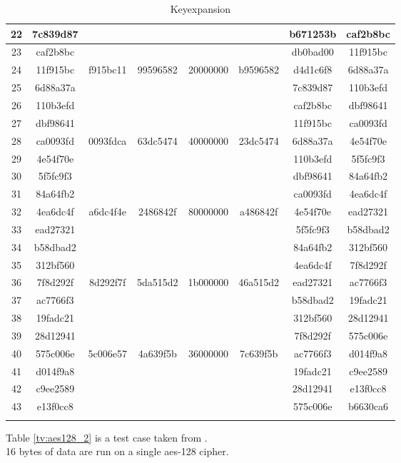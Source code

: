 \begin{small}
\begin{longtable}{| c | c | c | c | c | c | c | c |}
    22 & 7c839d87 & & & & & b671253b & caf2b8bc \\ \hline
    23 & caf2b8bc & & & & & db0bad00 & 11f915bc \\ \hline
    24 & 11f915bc & f915bc11 & 99596582 & 20000000
    & b9596582 & d4d1c6f8 & 6d88a37a \\ \hline
    25 & 6d88a37a & & & & & 7c839d87 & 110b3efd \\ \hline
    26 & 110b3efd & & & & & caf2b8bc & dbf98641 \\ \hline
    27 & dbf98641 & & & & & 11f915bc & ca0093fd \\ \hline
    28 & ca0093fd & 0093fdca & 63dc5474 & 40000000
    & 23dc5474 & 6d88a37a & 4e54f70e \\ \hline
    29 & 4e54f70e & & & & & 110b3efd & 5f5fc9f3 \\ \hline
    30 & 5f5fc9f3 & & & & & dbf98641 & 84a64fb2 \\ \hline
    31 & 84a64fb2 & & & & & ca0093fd & 4ea6dc4f \\ \hline
    32 & 4ea6dc4f & a6dc4f4e & 2486842f & 80000000
    & a486842f & 4e54f70e & ead27321 \\ \hline
    33 & ead27321 & & & & & 5f5fc9f3 & b58dbad2 \\ \hline
    34 & b58dbad2 & & & & & 84a64fb2 & 312bf560 \\ \hline
    35 & 312bf560 & & & & & 4ea6dc4f & 7f8d292f \\ \hline
    36 & 7f8d292f & 8d292f7f & 5da515d2 & 1b000000
    & 46a515d2 & ead27321 & ac7766f3 \\ \hline
    37 & ac7766f3 & & & & & b58dbad2 & 19fadc21 \\ \hline
    38 & 19fadc21 & & & & & 312bf560 & 28d12941 \\ \hline
    39 & 28d12941 & & & & & 7f8d292f & 575c006e \\ \hline
    40 & 575c006e & 5c006e57 & 4a639f5b & 36000000
    & 7c639f5b & ac7766f3 & d014f9a8 \\ \hline
    41 & d014f9a8 & & & & & 19fadc21 & c9ee2589 \\ \hline
    42 & c9ee2589 & & & & & 28d12941 & e13f0cc8 \\ \hline
    43 & e13f0cc8 & & & & & 575c006e & b6630ca6 \\ \hline
    \caption{Keyexpansion}
    \label{tv:keyexpansion}
  \end{longtable}
\end{small}

Table \ref{tv:aes128_2} is a test case taken from \citet[pp. 35--36]{AES:2001}.\\
16 bytes of data are run on a single aes-128 cipher.

